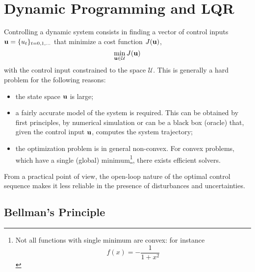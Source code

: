 \chapter{Dynamic Programming and LQR}
\label{sec:dynamic-programming-lqr}

Controlling a dynamic system consists in finding a vector of control inputs $\boldsymbol{\mathrm{u}} = \{u_t\}_{t=0,1,\ldots}$ that minimize a cost function $J(\boldsymbol{\mathrm{u}})$,
\begin{equation*}
  \min_{\boldsymbol{\mathrm{u}}\in\mathcal{U}} J(\boldsymbol{\mathrm{u}})
\end{equation*}
with the control input constrained to the space $\mathcal{U}$. This is generally a hard problem for the following reasons:
\begin{itemize}
\item the state space $\boldsymbol{\mathrm{u}}$ is large;
\item a fairly accurate model of the system is required. This can be obtained by first principles, by numerical simulation or can be a black box (oracle) that, given the control input $\boldsymbol{\mathrm{u}}$, computes the system trajectory;
\item the optimization problem is in general non-convex. For convex problems, which have a single (global) minimum\footnote{Not all functions with single minimum are convex: for instance
    \begin{equation*}
      f(x) = -\frac{1}{1+x^2}
    \end{equation*}}, there exists efficient solvers.
\end{itemize}
From a practical point of view, the open-loop nature of the optimal control sequence makes it less reliable in the presence of disturbances and uncertainties.

\section{Bellman's Principle}
\label{sec:bellmans-principle}

